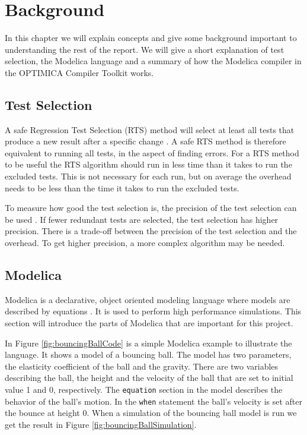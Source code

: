 \documentclass{cslthse-msc}
\begin{document}
\chapter[Background]{Background}
In this chapter we will explain concepts and give some background important to understanding the rest of the report. We will give a short explanation of test selection, the Modelica language and a summary of how the Modelica compiler in the OPTIMICA Compiler Toolkit works.

\section{Test Selection}
A safe Regression Test Selection (RTS) method will select at least all tests that produce a new result after a specific change \cite{DBLP:conf/pppj/OqvistHM16}. A safe RTS method is therefore equivalent to running all tests, in the aspect of finding errors. For a RTS method to be useful the RTS algorithm should run in less time than it takes to run the excluded tests. This is not necessary for each run, but on average the overhead needs to be less than the time it takes to run the excluded tests.

To measure how good the test selection is, the precision of the test selection can be used \cite{DBLP:conf/sigsoft/LegunsenHSLZM16}. If fewer redundant tests are selected, the test selection has higher precision. There is a trade-off between the precision of the test selection and the overhead. To get higher precision, a more complex algorithm may be needed.

\section{Modelica}
Modelica is a declarative, object oriented modeling language where models are described by equations \cite{modelicamodelica}. It is used to perform high performance simulations. This section will introduce the parts of Modelica that are important for this project.

In Figure \ref{fig:bouncingBallCode} is a simple Modelica example to illustrate the language. It shows a model of a bouncing ball. The model has two parameters, the elasticity coefficient of the ball and the gravity. There are two variables describing the ball, the height and the velocity of the ball that are set to initial value 1 and 0, respectively. The \texttt{equation} section in the model describes the behavior of the ball's motion. In the \texttt{when} statement the ball's velocity is set after the bounce at height 0. When a simulation of the bouncing ball model is run we get the result in Figure \ref{fig:bouncingBallSimulation}.
\end{document}
